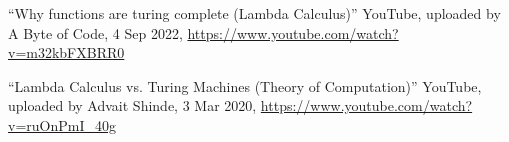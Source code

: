 \begin{thebibliography}{99}
	
	
	``Why functions are turing complete (Lambda Calculus)'' YouTube, uploaded by A Byte of Code, 4 Sep 2022, \url{https://www.youtube.com/watch?v=m32kbFXBRR0}
	
	``Lambda Calculus vs. Turing Machines (Theory of Computation)'' YouTube, uploaded by Advait Shinde, 3 Mar 2020, \url{https://www.youtube.com/watch?v=ruOnPmI_40g}
	
\end{thebibliography}